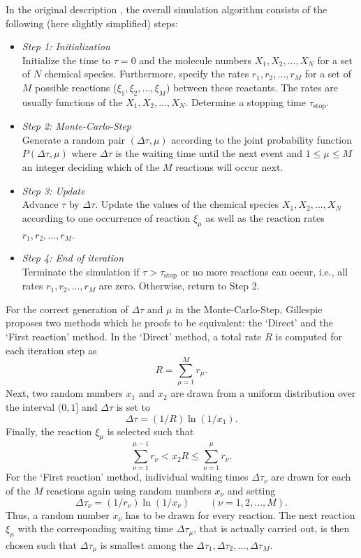 \documentclass[hidelinks,11pt]{scrreprt}
\begin{document}
In the original description \citep{gillespie1976}, the overall simulation algorithm consists of the following (here slightly simplified) steps:
\begin{itemize}
	\item \textit{Step 1: Initialization}\\
	Initialize the time to $\tau=0$ and the molecule numbers $X_1, X_2, ..., X_N$ for a set of $N$ chemical species. Furthermore, specify the rates $r_1, r_2, ..., r_M$ for a set of $M$ possible reactions ($\xi_1, \xi_2, ..., \xi_M$) between these reactants. The rates are usually functions of the $X_1, X_2, ..., X_N$. Determine a stopping time $\tau_{\textrm{stop}}$.
	\item \textit{Step 2: Monte-Carlo-Step}\\
	Generate a random pair $(\Delta\tau,\mu)$ according to the joint probability function $P(\Delta\tau,\mu)$ where $\Delta\tau$ is the waiting time until the next event and $1\le\mu\le M$ an integer deciding which of the $M$ reactions will occur next.
	\item \textit{Step 3: Update}\\
	Advance $\tau$ by $\Delta\tau$. Update the values of the chemical species $X_1, X_2, ..., X_N$ according to one occurrence of reaction $\xi_\mu$ as well as the reaction rates $r_1, r_2, ...,\allowbreak r_M$.
	\item \textit{Step 4: End of iteration}\\
	Terminate the simulation if $\tau>\tau_{\textrm{stop}}$ or no more reactions can occur, i.e., all rates $r_1, r_2, ..., r_M$ are zero. Otherwise, return to Step 2.
\end{itemize}

For the correct generation of $\Delta\tau$ and $\mu$ in the Monte-Carlo-Step, Gillespie proposes two methods which he proofs to be equivalent: the `Direct' and the `First reaction' method.
In the `Direct' method, a total rate $R$ is computed for each iteration step as
\begin{equation}\label{eq:total_rate_R}
R = \sum_{\mu=1}^{M}r_\mu.
\end{equation}
Next, two random numbers $x_1$ and $x_2$ are drawn from a uniform distribution over the interval $(0,1]$ and $\Delta\tau$ is set to
\begin{equation}
\Delta\tau = (1/R) \ln(1/x_1).
\end{equation}
Finally, the reaction $\xi_\mu$ is selected such that
\begin{equation}\label{eq:reaction_selection}
\sum_{\nu=1}^{\mu-1}r_\nu < x_2 R \le \sum_{\nu=1}^{\mu}r_\nu.
\end{equation}
For the `First reaction' method, individual waiting times $\Delta\tau_\nu$ are drawn for each of the $M$ reactions again using random numbers $x_\nu$ and setting
\begin{equation}
\Delta\tau_\nu = (1/r_\nu) \ln(1/x_\nu) \qquad (\nu = 1,2,...,M).
\end{equation}
Thus, a random number $x_\nu$ has to be drawn for every reaction. The next reaction $\xi_\mu$ with the corresponding waiting time $\Delta\tau_\mu$, that is actually carried out, is then chosen such that $\Delta\tau_\mu$ is smallest among the $\Delta\tau_1,\Delta\tau_2,...,\Delta\tau_M$.
\end{document}
